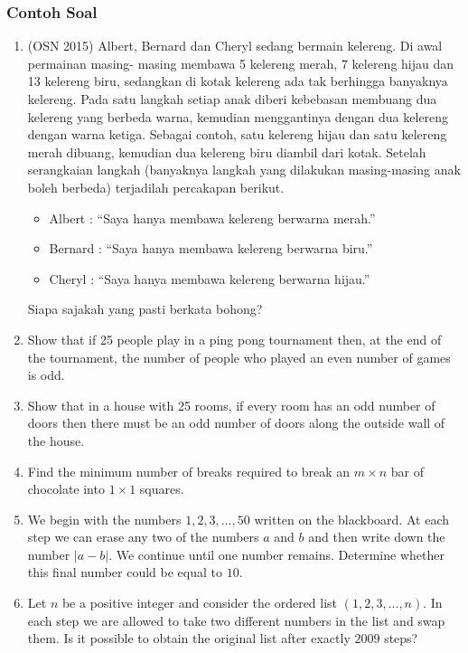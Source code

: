 \documentclass[12pt]{scrartcl}
\begin{document}
\subsubsection{Contoh Soal}
\begin{enumerate}
    \item (OSN 2015) Albert, Bernard dan Cheryl sedang bermain kelereng. Di awal permainan masing- masing membawa 5 kelereng merah, 7 kelereng hijau dan 13 kelereng biru, sedangkan di kotak kelereng ada tak berhingga banyaknya kelereng. Pada satu langkah setiap anak diberi kebebasan membuang dua kelereng yang berbeda warna, kemudian menggantinya dengan dua kelereng dengan warna ketiga. Sebagai contoh, satu kelereng hijau dan satu kelereng merah dibuang, kemudian dua kelereng biru diambil dari kotak. Setelah serangkaian langkah (banyaknya langkah yang dilakukan masing-masing anak boleh berbeda) terjadilah percakapan berikut.
    \begin{itemize}
        \item Albert : “Saya hanya membawa kelereng berwarna merah.”
        \item Bernard : “Saya hanya membawa kelereng berwarna biru.”
        \item Cheryl : “Saya hanya membawa kelereng berwarna hijau.”
    \end{itemize}
    Siapa sajakah yang pasti berkata bohong?
    
    \item Show that if 25 people play in a ping pong tournament then, at the end of the tournament, the number of people who played an even number of games is odd.

    \item Show that in a house with 25 rooms, if every room has an odd number of doors then there must be an odd number of doors along the outside wall of the house.
    
    \item Find the minimum number of breaks required to break an $m \times n$ bar of chocolate into $1 \times 1$ squares.
    
    \item We begin with the numbers $1, 2, 3, \ldots , 50$ written on the blackboard. At each step we can erase any two of the numbers $a$ and $b$ and then write down the number $|a-b|$. We continue until one number remains. Determine whether this final number could be equal to $10$.

    \item Let $n$ be a positive integer and consider the ordered list $(1, 2, 3,...,n)$. In each step we are allowed to take two different numbers in the list and swap them. Is it possible to obtain the original list after exactly $2009$ steps?


\end{enumerate}
\end{document}
